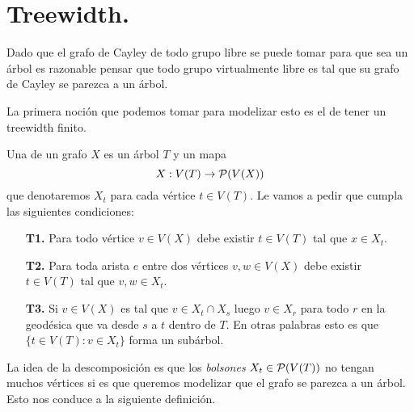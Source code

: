 \documentclass[tesis.tex]{subfiles}
\begin{document}
\section{Treewidth.}

Dado que el grafo de Cayley de todo grupo libre se puede tomar para que sea un árbol es razonable pensar que todo grupo virtualmente libre es tal que su grafo de Cayley se parezca a un árbol. 

La primera noción que podemos tomar para modelizar esto es el de tener un treewidth finito.

\begin{deff}\label{desc-arbol}
	Una  de un grafo $X$ es un árbol $T$ y un mapa 
	\[
	X: V(T) \to {\cal P}(V(X))
	\]
	que denotaremos $X_t$ para cada vértice $t \in V(T)$. 
	Le vamos a pedir que cumpla las siguientes condiciones:
	\begin{enumerate}
		\item[\textbf{T1.}] Para todo vértice $v \in V(X)$ debe existir $t \in V(T)$ tal que $x \in X_t$. 
		\item[\textbf{T2.}] Para toda arista $e$ entre dos vértices $v,w \in V(X)$ debe existir $t \in V(T)$ tal que $v,w \in X_t$.
		\item[\textbf{T3.}] Si $v \in V(X)$ es tal que $v \in X_t \cap X_s$ luego $v \in X_r$ para todo $r$ en la geodésica que va desde $s$ a $t$ dentro de $T$. En otras palabras esto es que $\{ t \in V(T) :  v \in X_t \}$ forma un subárbol. 
	\end{enumerate} 
\end{deff}
\smallskip

La idea de la descomposición es que los \emph{bolsones} $X_t \in {\cal P}(V(T))$ no tengan muchos vértices si es que queremos modelizar que el grafo se parezca a un árbol. Esto nos conduce a la siguiente definición.
\end{document}
